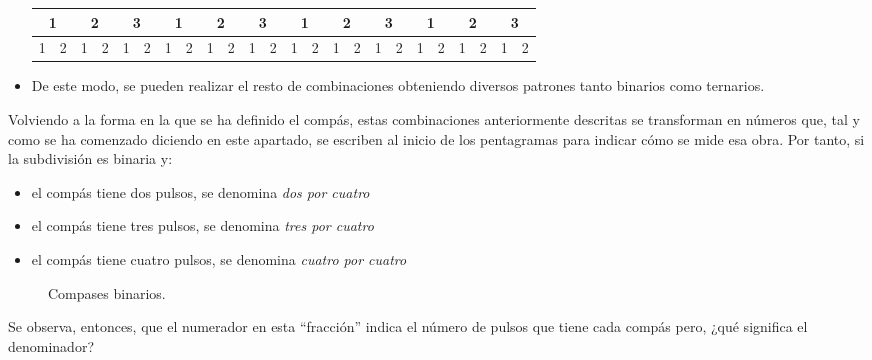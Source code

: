 \documentclass[a4paper, openright, 11pt, titlepage]{report}
\theoremstyle{definition}\newtheorem{defin}[propo]{Definition}
\theoremstyle{definition}\newtheorem{obser}[propo]{Remark}
\theoremstyle{definition}\newtheorem{ejem}[propo]{Ejemplo}
\theoremstyle{definition}\newtheorem{algoritmo}[propo]{Algoritmo}
\begin{document}
\begin{itemize}
\begin{table}[H]
    \centering
    \begin{tabular}{|c|c|c|c|c|c|c|c|c|c|c|c|c|c|c|c|c|c|c|c|c|c|c|c|}
    \hline
        \multicolumn{2}{|c}{\cellcolor{acento}1} & \multicolumn{2}{|c}{2} & \multicolumn{2}{|c}{3} & \multicolumn{2}{|c}{\cellcolor{acento}1} & \multicolumn{2}{|c}{2} & \multicolumn{2}{|c}{3} & \multicolumn{2}{|c}{\cellcolor{acento}1} & \multicolumn{2}{|c}{2} & \multicolumn{2}{|c}{3} & \multicolumn{2}{|c}{\cellcolor{acento}1} & \multicolumn{2}{|c}{2} & \multicolumn{2}{|c|}{3} \\
    \hline
        \cellcolor{acento}1 & 2 & 1 & 2 & 1 & 2 & \cellcolor{acento}1 & 2 & 1 & 2 & 1 & 2 & \cellcolor{acento}1 & 2 & 1 & 2 & 1 & 2 & \cellcolor{acento}1 & 2 & 1 & 2 & 1 & 2\\
        \hline
    \end{tabular}
\end{table}
\item De este modo, se pueden realizar el resto de combinaciones obteniendo diversos patrones tanto binarios como ternarios.
\end{itemize}
Volviendo a la forma en la que se ha definido el compás, estas combinaciones anteriormente descritas se transforman en números que, tal y como se ha comenzado diciendo en este apartado, se escriben al inicio de los pentagramas para indicar cómo se mide esa obra. Por tanto, si la subdivisión es binaria y:
\begin{itemize}
    \item el compás tiene dos pulsos, se denomina \textit{dos por cuatro}
    \item el compás tiene tres pulsos, se denomina \textit{tres por cuatro}
    \item el compás tiene cuatro pulsos, se denomina \textit{cuatro por cuatro}
\end{itemize}
 \begin{figure}[H]
        \centering
         \hspace{1.7cm}
            \hspace{1.7cm}
            \hspace{1.7cm}
        \caption{Compases binarios.}
        \label{binarios}
\end{figure}
Se observa, entonces, que el numerador en esta ``fracción'' indica el número de pulsos que tiene cada compás pero, ¿qué significa el denominador?\\ 
\end{document}
